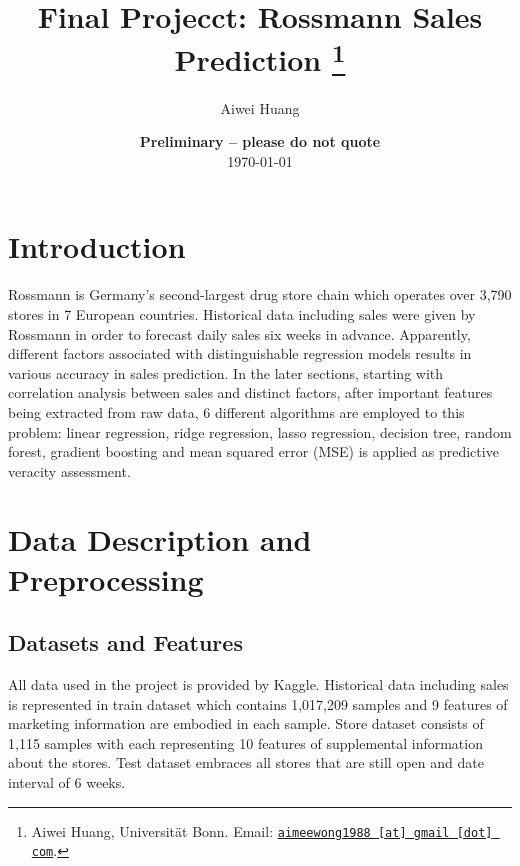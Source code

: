 \documentclass[11pt, a4paper, leqno]{article}
\begin{document}
\title{Final Projecct: Rossmann Sales Prediction \thanks{Aiwei Huang, Universität Bonn. Email: \href{mailto:aimeewong1988@gmail.com}{\nolinkurl{aimeewong1988 [at] gmail [dot] com}}.}}

\author{Aiwei Huang}

\date{
{\bf Preliminary -- please do not quote}
\\[1ex] 
\today
}

\maketitle


\clearpage

\section{Introduction} %
Rossmann is Germany's second-largest drug store chain which operates over 3,790 stores in 7 European countries. Historical data including sales were given by Rossmann in order to forecast daily sales six weeks in advance. Apparently, different factors associated with distinguishable regression models results in various accuracy in sales prediction. In the later sections, starting with correlation analysis between sales and distinct factors, after important features being extracted from raw data, 6 different algorithms are employed to this problem: linear regression, ridge regression, lasso regression, decision tree, random forest, gradient boosting and mean squared error (MSE) is applied as predictive veracity assessment.

\section{Data Description and Preprocessing}


\subsection{Datasets and Features}

All data used in the project is provided by Kaggle. Historical data including sales is represented in train dataset which contains 1,017,209 samples and 9 features of marketing information are embodied in each sample. Store dataset consists of 1,115 samples with each representing 10 features of supplemental information about the stores. Test dataset embraces all stores that are still open and date interval of 6 weeks.
\end{document}
